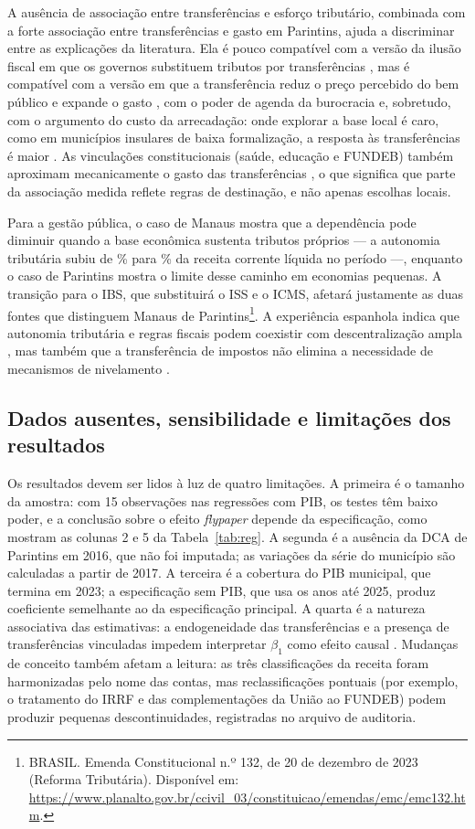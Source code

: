 A ausência de associação entre transferências e esforço tributário, combinada com a forte associação entre transferências e gasto em Parintins, ajuda a discriminar entre as explicações da literatura. Ela é pouco compatível com a versão da ilusão fiscal em que os governos substituem tributos por transferências \cite{mattos2011}, mas é compatível com a versão em que a transferência reduz o preço percebido do bem público e expande o gasto \cite{logan1986,turnbull1998}, com o poder de agenda da burocracia \cite{filimon1982} e, sobretudo, com o argumento do custo da arrecadação: onde explorar a base local é caro, como em municípios insulares de baixa formalização, a resposta às transferências é maior \cite{aragon2013,dahlby2011}. As vinculações constitucionais (saúde, educação e FUNDEB) também aproximam mecanicamente o gasto das transferências \cite{cruz2020}, o que significa que parte da associação medida reflete regras de destinação, e não apenas escolhas locais.

Para a gestão pública, o caso de Manaus mostra que a dependência pode diminuir quando a base econômica sustenta tributos próprios --- a autonomia tributária subiu de \autManIni\% para \autManFim\% da receita corrente líquida no período ---, enquanto o caso de Parintins mostra o limite desse caminho em economias pequenas. A transição para o IBS, que substituirá o ISS e o ICMS, afetará justamente as duas fontes que distinguem Manaus de Parintins\footnote{BRASIL. Emenda Constitucional n.º 132, de 20 de dezembro de 2023 (Reforma Tributária). Disponível em: \url{https://www.planalto.gov.br/ccivil_03/constituicao/emendas/emc/emc132.htm}.}. A experiência espanhola indica que autonomia tributária e regras fiscais podem coexistir com descentralização ampla \cite{arespa2022,asatryan2015}, mas também que a transferência de impostos não elimina a necessidade de mecanismos de nivelamento \cite{zabalza2011}.

\subsection{Dados ausentes, sensibilidade e limitações dos resultados}

Os resultados devem ser lidos à luz de quatro limitações. A primeira é o tamanho da amostra: com 15 observações nas regressões com PIB, os testes têm baixo poder, e a conclusão sobre o efeito \textit{flypaper} depende da especificação, como mostram as colunas 2 e 5 da Tabela~\ref{tab:reg}. A segunda é a ausência da DCA de Parintins em 2016, que não foi imputada; as variações da série do município são calculadas a partir de 2017. A terceira é a cobertura do PIB municipal, que termina em 2023; a especificação sem PIB, que usa os anos até 2025, produz coeficiente semelhante ao da especificação principal. A quarta é a natureza associativa das estimativas: a endogeneidade das transferências e a presença de transferências vinculadas impedem interpretar $\beta_1$ como efeito causal \cite{knight2002}. Mudanças de conceito também afetam a leitura: as três classificações da receita foram harmonizadas pelo nome das contas, mas reclassificações pontuais (por exemplo, o tratamento do IRRF e das complementações da União ao FUNDEB) podem produzir pequenas descontinuidades, registradas no arquivo de auditoria.
